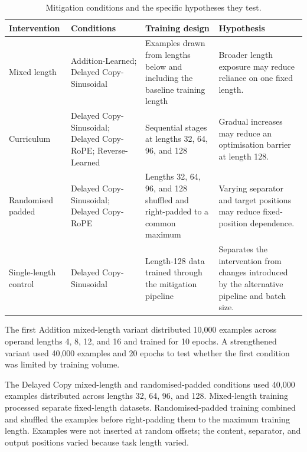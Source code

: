 \documentclass[
    author={Aanchala Ravindra Bhongade},
    supervisor={Dr. Fernando Moreno-Pino},
    degree={MSc},
    title={Length Generalisation in Transformer-Based Sequence Models: Failure Taxonomy and Mitigation Strategies},
    subtitle={},
    type={},
    year={2026}
]{dissertation}
\begin{document}
\begin{table}[tbp]
\centering
\scriptsize
\renewcommand{\arraystretch}{1.15}
\begin{tabular}{
    p{}
    p{}
    p{}
    p{}
}
\hline
\textbf{Intervention} &
\textbf{Conditions} &
\textbf{Training design} &
\textbf{Hypothesis} \\
\hline

Mixed length &
Addition-Learned; Delayed Copy-Sinusoidal &
Examples drawn from lengths below and including the baseline training length &
Broader length exposure may reduce reliance on one fixed length. \\

Curriculum &
Delayed Copy-Sinusoidal; Delayed Copy-RoPE; Reverse-Learned &
Sequential stages at lengths 32, 64, 96, and 128 &
Gradual increases may reduce an optimisation barrier at length 128. \\

Randomised padded &
Delayed Copy-Sinusoidal; Delayed Copy-RoPE &
Lengths 32, 64, 96, and 128 shuffled and right-padded to a common maximum &
Varying separator and target positions may reduce fixed-position dependence. \\

Single-length control &
Delayed Copy-Sinusoidal &
Length-128 data trained through the mitigation pipeline &
Separates the intervention from changes introduced by the alternative pipeline and batch size. \\
\hline
\end{tabular}
\caption{Mitigation conditions and the specific hypotheses they test.}
\label{tab:mitigation-design}
\end{table}

The first Addition mixed-length variant distributed 10,000 examples across operand lengths 4, 8, 12, and 16 and trained for 10 epochs. A strengthened variant used 40,000 examples and 20 epochs to test whether the first condition was limited by training volume.

The Delayed Copy mixed-length and randomised-padded conditions used 40,000 examples distributed across lengths 32, 64, 96, and 128. Mixed-length training processed separate fixed-length datasets. Randomised-padded training combined and shuffled the examples before right-padding them to the maximum training length. Examples were not inserted at random offsets; the content, separator, and output positions varied because task length varied.
\end{document}
